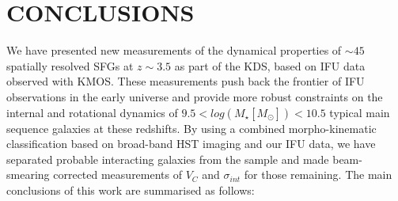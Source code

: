\documentclass[fleqn,usenatbib]{mn2e}
\begin{document}
\section{CONCLUSIONS}\label{sec:conclusion}
We have presented new measurements of the dynamical properties of $\sim 45$ spatially resolved SFGs at $z\sim3.5$ as part of the KDS, based on IFU data observed with KMOS.
These measurements push back the frontier of IFU observations in the early universe and provide more robust constraints on the internal and rotational dynamics of $9.5 < log(M_{\star}[M_{\odot}])< 10.5$ typical main sequence galaxies at these redshifts.
By using a combined morpho-kinematic classification based on broad-band HST imaging and our IFU data, we have separated probable interacting galaxies from the sample and made beam-smearing corrected measurements of $V_{C}$ and $\sigma_{int}$ for those remaining.
The main conclusions of this work are summarised as follows:
\end{document}
